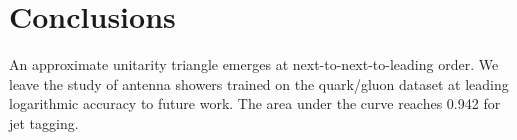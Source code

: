 \section{Conclusions}\label{sec:conclusions}

An approximate unitarity triangle emerges at next-to-next-to-leading
order. We leave the study of antenna showers trained on the quark/gluon
dataset at leading logarithmic accuracy to future work. The area under
the curve reaches 0.942 for jet tagging.

